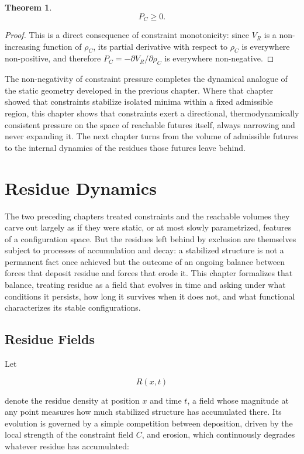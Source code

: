 \documentclass[11pt,oneside]{book}
\theoremstyle{plain}
\newtheorem{theorem}{Theorem}[chapter]
\theoremstyle{definition}
\theoremstyle{remark}
\begin{document}
\begin{theorem}
\[
P_C\ge0.
\]
\end{theorem}

\begin{proof}
This is a direct consequence of constraint monotonicity: since \(V_R\) is a non-increasing function of \(\rho_C\), its partial derivative with respect to \(\rho_C\) is everywhere non-positive, and therefore \(P_C=-\partial V_R/\partial\rho_C\) is everywhere non-negative.
\end{proof}

The non-negativity of constraint pressure completes the dynamical analogue of the static geometry developed in the previous chapter. Where that chapter showed that constraints stabilize isolated minima within a fixed admissible region, this chapter shows that constraints exert a directional, thermodynamically consistent pressure on the space of reachable futures itself, always narrowing and never expanding it. The next chapter turns from the volume of admissible futures to the internal dynamics of the residues those futures leave behind.

\chapter{Residue Dynamics}

The two preceding chapters treated constraints and the reachable volumes they carve out largely as if they were static, or at most slowly parametrized, features of a configuration space. But the residues left behind by exclusion are themselves subject to processes of accumulation and decay: a stabilized structure is not a permanent fact once achieved but the outcome of an ongoing balance between forces that deposit residue and forces that erode it. This chapter formalizes that balance, treating residue as a field that evolves in time and asking under what conditions it persists, how long it survives when it does not, and what functional characterizes its stable configurations.

\section{Residue Fields}

Let

\[
R(x,t)
\]

denote the residue density at position \(x\) and time \(t\), a field whose magnitude at any point measures how much stabilized structure has accumulated there. Its evolution is governed by a simple competition between deposition, driven by the local strength of the constraint field \(C\), and erosion, which continuously degrades whatever residue has accumulated:
\end{document}
